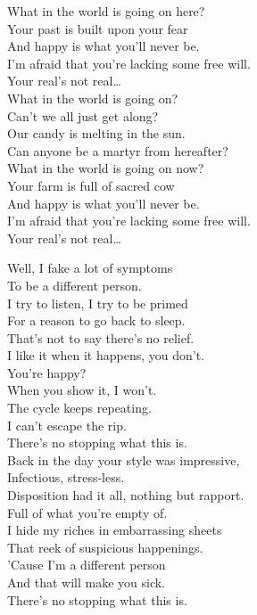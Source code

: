What in the world is going on here? \\
Your past is built upon your fear \\
And happy is what you'll never be. \\
I'm afraid that you're lacking some free will. \\

Your real's not real… \\

What in the world is going on? \\
Can't we all just get along? \\
Our candy is melting in the sun. \\
Can anyone be a martyr from hereafter? \\

What in the world is going on now? \\
Your farm is full of sacred cow \\
And happy is what you'll never be. \\
I'm afraid that you're lacking some free will. \\

Your real's not real… \\





Well, I fake a lot of symptoms \\
To be a different person. \\
I try to listen, I try to be primed \\
For a reason to go back to sleep. \\
That's not to say there's no relief. \\
I like it when it happens, you don't. \\
You're happy? \\
When you show it, I won't. \\
The cycle keeps repeating. \\
I can't escape the rip. \\
There's no stopping what this is. \\

Back in the day your style was impressive, \\
Infectious, stress-less. \\
Disposition had it all, nothing but rapport. \\
Full of what you're empty of. \\
I hide my riches in embarrassing sheets \\
That reek of suspicious happenings. \\
'Cause I'm a different person \\
And that will make you sick. \\
There's no stopping what this is. \\

